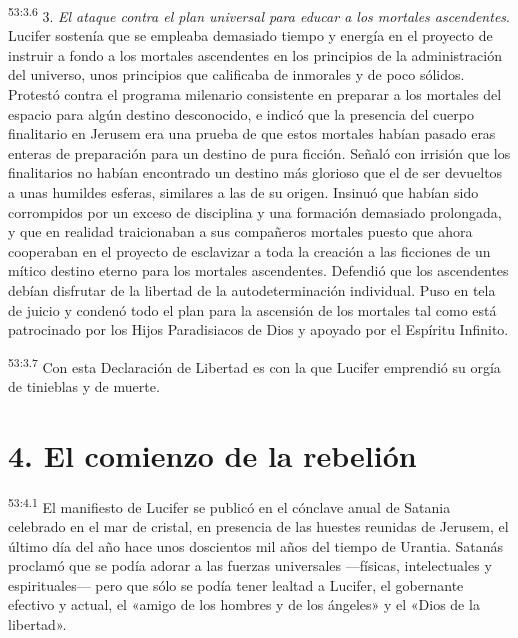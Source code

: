 \par
\textsuperscript{53:3.6} 3. \textit{El ataque contra el plan universal para educar a los mortales ascendentes}. Lucifer sostenía que se empleaba demasiado tiempo y energía en el proyecto de instruir a fondo a los mortales ascendentes en los principios de la administración del universo, unos principios que calificaba de inmorales y de poco sólidos. Protestó contra el programa milenario consistente en preparar a los mortales del espacio para algún destino desconocido, e indicó que la presencia del cuerpo finalitario en Jerusem era una prueba de que estos mortales habían pasado eras enteras de preparación para un destino de pura ficción. Señaló con irrisión que los finalitarios no habían encontrado un destino más glorioso que el de ser devueltos a unas humildes esferas, similares a las de su origen. Insinuó que habían sido corrompidos por un exceso de disciplina y una formación demasiado prolongada, y que en realidad traicionaban a sus compañeros mortales puesto que ahora cooperaban en el proyecto de esclavizar a toda la creación a las ficciones de un mítico destino eterno para los mortales ascendentes. Defendió que los ascendentes debían disfrutar de la libertad de la autodeterminación individual. Puso en tela de juicio y condenó todo el plan para la ascensión de los mortales tal como está patrocinado por los Hijos Paradisiacos de Dios y apoyado por el Espíritu Infinito.

\par
\textsuperscript{53:3.7} Con esta Declaración de Libertad es con la que Lucifer emprendió su orgía de tinieblas y de muerte.

\section*{4. El comienzo de la rebelión}
\par
\textsuperscript{53:4.1} El manifiesto de Lucifer se publicó en el cónclave anual de Satania celebrado en el mar de cristal, en presencia de las huestes reunidas de Jerusem, el último día del año hace unos doscientos mil años del tiempo de Urantia. Satanás proclamó que se podía adorar a las fuerzas universales ---físicas, intelectuales y espirituales--- pero que sólo se podía tener lealtad a Lucifer, el gobernante efectivo y actual, el «amigo de los hombres y de los ángeles» y el «Dios de la libertad».

